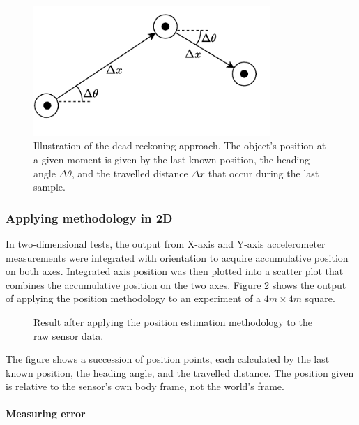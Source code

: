 \begin{figure}[!h]
    \centering
    \includegraphics[width=0.8\textwidth]{figures/dead_reckoning.pdf}
    \caption{Illustration of the dead reckoning approach. The object's position at a given moment is given by the last known position, the heading angle $\Delta \theta$, and the travelled distance $\Delta x$ that occur during the last sample. }
    \label{fig:position}
\end{figure}

\newpage

\subsubsection{Applying methodology in 2D}

In two-dimensional tests, the output from X-axis and Y-axis accelerometer measurements were integrated with orientation to acquire accumulative position on both axes. Integrated axis position was then plotted into a scatter plot that combines the accumulative position on the two axes. Figure \ref{fig:square} shows the output of applying the position methodology to an experiment of a $4m\times 4m$ square.

\begin{figure}[!h]
    \centering
    \resizebox{0.8\linewidth}{!}{}
    \caption{ Result after applying the position estimation methodology to the raw sensor data. }
    \label{fig:square}
\end{figure}

The figure shows a succession of position points, each calculated by the last known position, the heading angle, and the travelled distance. The position given is relative to the sensor's own body frame, not the world's frame.

\paragraph{Measuring error}

